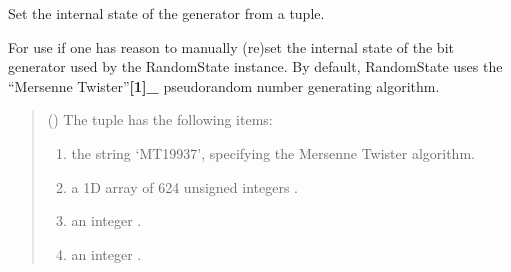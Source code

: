 \documentclass[letterpaper,10pt,english]{sphinxmanual}
\begin{document}
\begin{fulllineitems}
\label{\detokenize{metilda.controllers:metilda.controllers.pitch_art_wizard.set_state}}
\pysigstartsignatures
{}
\pysigstopsignatures
\sphinxAtStartPar
Set the internal state of the generator from a tuple.

\sphinxAtStartPar
For use if one has reason to manually (re\sphinxhyphen{})set the internal state of
the bit generator used by the RandomState instance. By default,
RandomState uses the “Mersenne Twister”{\color{red}\bfseries{}{[}1{]}\_} pseudo\sphinxhyphen{}random number
generating algorithm.
\begin{quote}\begin{description}
\sphinxAtStartPar
{} (\sphinxstyleliteralemphasis{\sphinxupquote{(}}\sphinxstyleliteralemphasis{\sphinxupquote{, }}\sphinxstyleliteralemphasis{\sphinxupquote{, }}\sphinxstyleliteralemphasis{\sphinxupquote{, }}\sphinxstyleliteralemphasis{\sphinxupquote{, }}\sphinxstyleliteralemphasis{\sphinxupquote{)}}\sphinxstyleliteralemphasis{\sphinxupquote{, }}) \textendash{} 
\sphinxAtStartPar
The  tuple has the following items:
\begin{enumerate}
%
\item {} 
\sphinxAtStartPar
the string ‘MT19937’, specifying the Mersenne Twister algorithm.

\item {} 
\sphinxAtStartPar
a 1\sphinxhyphen{}D array of 624 unsigned integers .

\item {} 
\sphinxAtStartPar
an integer .

\item {} 
\sphinxAtStartPar
an integer .


\end{enumerate}
\end{description}
\end{quote}
\end{fulllineitems}
\end{document}
